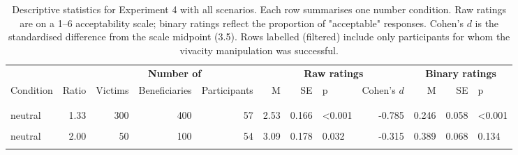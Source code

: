 \documentclass[
]{article}
\begin{document}
\begin{longtable}[t]{lrrrrrrlrrrl}
\caption{\label{tab:exp8-all-scenarios-descriptives-print}Descriptive statistics for Experiment 4 with all scenarios. Each row summarises one number condition. Raw ratings are on a 1--6 acceptability scale; binary ratings reflect the proportion of "acceptable" responses. Cohen's $d$ is the standardised difference from the scale midpoint (3.5). Rows labelled (filtered) include only participants for whom the vivacity manipulation was successful.}\\
\toprule
\multicolumn{2}{c}{\textbf{ }} & \multicolumn{3}{c}{\textbf{Number of}} & \multicolumn{4}{c}{\textbf{Raw ratings}} & \multicolumn{3}{c}{\textbf{Binary ratings}} \\
\cmidrule(l{3pt}r{3pt}){3-5} \cmidrule(l{3pt}r{3pt}){6-9} \cmidrule(l{3pt}r{3pt}){10-12}
Condition & Ratio & Victims & Beneficiaries & Participants & M & SE & p & Cohen's $d$ & M & SE & p\\
\midrule
\addlinespace[0.3em]
\multicolumn{12}{l}{\textbf{Exp. 4}}\\
\hspace{1em}\cellcolor{gray!10}{neutral} & \cellcolor{gray!10}{1.33} & \cellcolor{gray!10}{30} & \cellcolor{gray!10}{40} & \cellcolor{gray!10}{54} & \cellcolor{gray!10}{2.39} & \cellcolor{gray!10}{0.161} & \cellcolor{gray!10}{<0.001} & \cellcolor{gray!10}{-0.948} & \cellcolor{gray!10}{0.167} & \cellcolor{gray!10}{0.052} & \cellcolor{gray!10}{<0.001}\\
\hspace{1em}neutral & 1.33 & 300 & 400 & 57 & 2.53 & 0.166 & <0.001 & -0.785 & 0.246 & 0.058 & <0.001\\
\hspace{1em}\cellcolor{gray!10}{neutral} & \cellcolor{gray!10}{2.00} & \cellcolor{gray!10}{20} & \cellcolor{gray!10}{40} & \cellcolor{gray!10}{57} & \cellcolor{gray!10}{2.98} & \cellcolor{gray!10}{0.191} & \cellcolor{gray!10}{0.019} & \cellcolor{gray!10}{-0.361} & \cellcolor{gray!10}{0.404} & \cellcolor{gray!10}{0.066} & \cellcolor{gray!10}{0.185}\\
\hspace{1em}neutral & 2.00 & 50 & 100 & 54 & 3.09 & 0.178 & 0.032 & -0.315 & 0.389 & 0.068 & 0.134\\
\hspace{1em}\cellcolor{gray!10}{neutral} & \cellcolor{gray!10}{3.00} & \cellcolor{gray!10}{10} & \cellcolor{gray!10}{30} & \cellcolor{gray!10}{57} & \cellcolor{gray!10}{3.17} & \cellcolor{gray!10}{0.194} & \cellcolor{gray!10}{0.139} & \cellcolor{gray!10}{-0.223} & \cellcolor{gray!10}{0.474} & \cellcolor{gray!10}{0.067} & \cellcolor{gray!10}{0.791}\\

\end{longtable}
\end{document}

